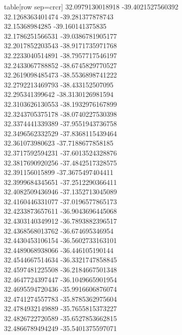   table[row sep=crcr]{%
32.0979130018918	-39.4021527560392\\
32.1268363401474	-39.281377878743\\
32.15368984285	-39.160141375835\\
32.1786251566531	-39.0386781905177\\
32.2017852203543	-38.9171735971768\\
32.2233040514891	-38.7957717546197\\
32.2433067788852	-38.6745829770527\\
32.2619098485473	-38.5536898741222\\
32.2792213469793	-38.433152507095\\
32.295341399642	-38.3130126981594\\
32.3103626130553	-38.1932976167899\\
32.3243705375178	-38.0740227530398\\
32.3374441339389	-37.9551943736758\\
32.3496562332529	-37.8368115439464\\
32.361073980623	-37.7188677858185\\
32.3717592594231	-37.6013524328876\\
32.3817690920256	-37.4842517328575\\
32.391156015899	-37.3675497404411\\
32.3999684345651	-37.2512290366411\\
32.4082509436946	-37.1352713045089\\
32.4160446331077	-37.0196577865173\\
32.4233873657611	-36.9043696445068\\
32.4303140349912	-36.7893882396517\\
32.4368568013762	-36.674695346954\\
32.4430453106154	-36.5602733163101\\
32.4489068938066	-36.446105190144\\
32.4544667514634	-36.3321747858845\\
32.4597481225508	-36.2184667501348\\
32.4647724397447	-36.1049665901954\\
32.4695594720436	-35.9916606876074\\
32.4741274557783	-35.8785362975604\\
32.4784932149889	-35.7655815373227\\
32.4826722720589	-35.6527853662815\\
32.4866789494249	-35.5401375597071\\
}
